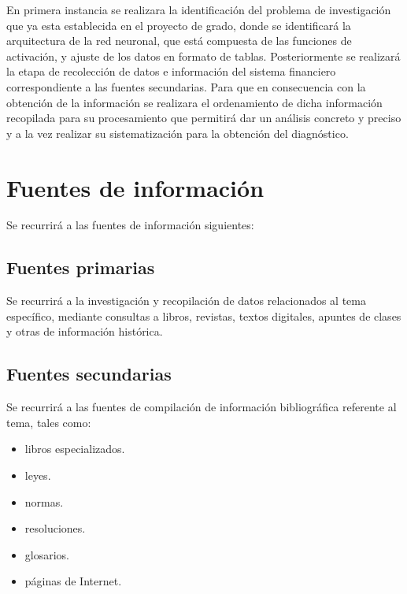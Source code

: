 \documentclass[
  12pt,
]{article}
\providecommand{\tightlist}{%
  \setlength{\itemsep}{0pt}\setlength{\parskip}{0pt}}
\begin{document}
En primera instancia se realizara la identificación del problema de
investigación que ya esta establecida en el proyecto de grado, donde se
identificará la arquitectura de la red neuronal, que está compuesta de
las funciones de activación, y ajuste de los datos en formato de tablas.
Posteriormente se realizará la etapa de recolección de datos e
información del sistema financiero correspondiente a las fuentes
secundarias. Para que en consecuencia con la obtención de la información
se realizara el ordenamiento de dicha información recopilada para su
procesamiento que permitirá dar un análisis concreto y preciso y a la
vez realizar su sistematización para la obtención del diagnóstico.

\newpage


\newpage

\hypertarget{fuentes-de-informaciuxf3n}{%
\section{Fuentes de información}\label{fuentes-de-informaciuxf3n}}

Se recurrirá a las fuentes de información siguientes:

\hypertarget{fuentes-primarias}{%
\subsection{Fuentes primarias}\label{fuentes-primarias}}

Se recurrirá a la investigación y recopilación de datos relacionados al
tema específico, mediante consultas a libros, revistas, textos
digitales, apuntes de clases y otras de información histórica.

\hypertarget{fuentes-secundarias}{%
\subsection{Fuentes secundarias}\label{fuentes-secundarias}}

Se recurrirá a las fuentes de compilación de información bibliográfica
referente al tema, tales como:

\begin{itemize}
\tightlist
\item
  libros especializados.
\item
  leyes.
\item
  normas.
\item
  resoluciones.
\item
  glosarios.
\item
  páginas de Internet.
\end{itemize}
\end{document}
